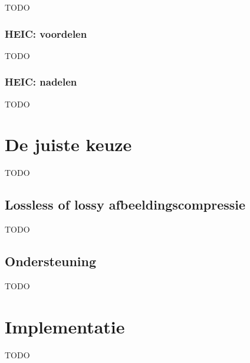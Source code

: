 TODO


\subsubsection{HEIC: voordelen}
\label{sec:afbeeldingscompressie-heic-voordelen}

TODO

\subsubsection{HEIC: nadelen}
\label{sec:afbeeldingscompressie-heic-nadelen}

TODO

\section{De juiste keuze}
\label{sec:afbeeldingscompressie-keuze}

TODO

\subsection{Lossless of lossy afbeeldingscompressie}
\label{sec:afbeeldingscompressie-lossless-of-lossy}

TODO

\subsection{Ondersteuning}
\label{sec:afbeeldingscompressie-ondersteuning}

TODO

\section{Implementatie}
\label{sec:afbeeldingscompressie-implementatie}

TODO
